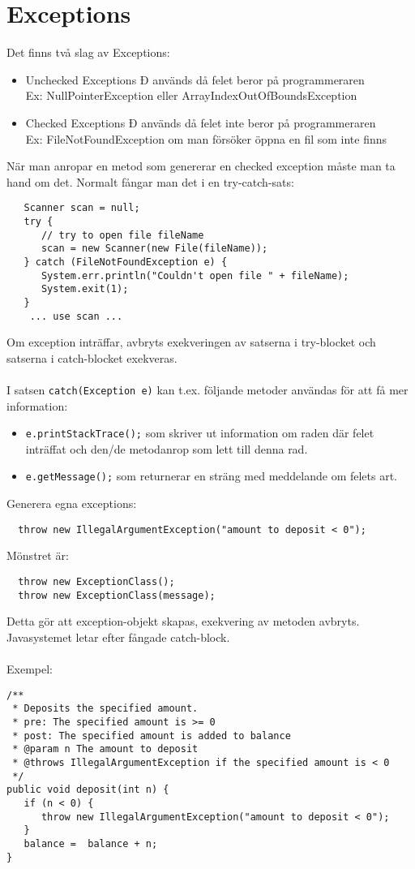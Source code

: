 \documentclass[11pt]{article}
\begin{document}
\section{Exceptions}
Det finns två slag av Exceptions:
\begin{itemize}
\item{Unchecked Exceptions Ð används då felet beror på programmeraren \\
Ex: NullPointerException eller ArrayIndexOutOfBoundsException
}
\item{Checked Exceptions Ð används då felet inte beror på programmeraren \\
Ex: FileNotFoundException om man försöker öppna en fil som inte finns
}
\end{itemize}
När man anropar en metod som genererar en checked exception måste man ta hand om det. Normalt fångar man det i en try-catch-sats:
\begin{lstlisting}
   Scanner scan = null;
   try {
      // try to open file fileName
      scan = new Scanner(new File(fileName));
   } catch (FileNotFoundException e) {
      System.err.println("Couldn't open file " + fileName);
      System.exit(1);
   }
    ... use scan ...
\end{lstlisting}
Om exception inträffar, avbryts exekveringen av satserna i try-blocket och satserna i catch-blocket exekveras.
\\ \\
I satsen \verb+catch(Exception e)+ kan t.ex. följande metoder användas för att få mer information:
\begin{itemize}
\item{ \verb+e.printStackTrace();+ som skriver ut information om raden där felet inträffat och den/de metodanrop som lett till denna rad.}
\item{ \verb+e.getMessage();+ som returnerar en sträng med meddelande om felets art.}
\end{itemize}
Generera egna exceptions:
\begin{lstlisting}
  throw new IllegalArgumentException("amount to deposit < 0");
\end{lstlisting}
Mönstret är: 
\begin{lstlisting}
  throw new ExceptionClass(); 
  throw new ExceptionClass(message); 
\end{lstlisting}
Detta gör att exception-objekt skapas, exekvering av metoden avbryts. Javasystemet letar efter fångade catch-block.
\\ \\
Exempel:
\begin{lstlisting}
/**
 * Deposits the specified amount.
 * pre: The specified amount is >= 0
 * post: The specified amount is added to balance
 * @param n The amount to deposit
 * @throws IllegalArgumentException if the specified amount is < 0
 */
public void deposit(int n) {
   if (n < 0) {
      throw new IllegalArgumentException("amount to deposit < 0");
   }
   balance =  balance + n;
}
\end{lstlisting}
\end{document}
